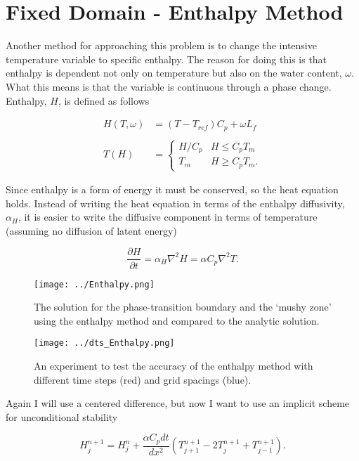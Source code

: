 \documentclass[12pt]{article}
\begin{document}
\section{Fixed Domain - Enthalpy Method}

Another method for approaching this problem is to change the intensive temperature variable to specific enthalpy. The reason for doing this is that enthalpy is dependent not only on temperature but also on the water content, $\omega$. What this means is that the variable is continuous through a phase change. Enthalpy, $H$, is defined as follows 

\begin{equation}
\begin{aligned}
H(T,\omega) &= (T-T_{ref})C_p + \omega L_f \\~\\
T(H) &=
\begin{cases}
H/{C_p} & H \leq C_p T_m \\
T_m & H \geq C_p T_m.
\end{cases}
\end{aligned}
\end{equation}

Since enthalpy is a form of energy it must be conserved, so the heat equation holds. Instead of writing the heat equation in terms of the enthalpy diffusivity, $\alpha_H$, it is easier to write the diffusive component in terms of temperature (assuming no diffusion of latent energy)

\begin{equation}
\frac{\partial H}{\partial t} = \alpha_H \nabla^2 H = 
\alpha C_p \nabla^2 T.
\end{equation}

\begin{figure}[]
\centering
{}
  \texttt{[image: ../Enthalpy.png]}
  \caption{The solution for the phase-transition boundary and the `mushy zone' using the enthalpy method and compared to the analytic solution.}
  \label{Enth}
\endminipage
\hfill
{}
  \texttt{[image: ../dts\_Enthalpy.png]}
  \caption{An experiment to test the accuracy of the enthalpy method with different time steps (red) and grid spacings (blue).}
  \label{Accuracy}
\endminipage
\end{figure}

Again I will use a centered difference, but now I want to use an implicit scheme for unconditional stability

\begin{equation}
H_j^{n+1} = H_j^n + 
\frac{\alpha C_p dt}{dx^2}(T_{j+1}^{n+1} - 2T_{j}^{n+1} + T_{j-1}^{n+1}).
\end{equation}
\end{document}
